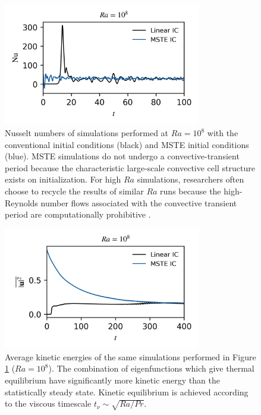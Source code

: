 \documentclass[reprint,amsmath,amssymb,aps]{revtex4-1}
\begin{document}
\begin{figure}
    \begin{minipage}{3.4in}
        \centering
        \includegraphics[width=3.4in]{sim_eq_nu.png}
        \caption{Nusselt numbers of simulations performed at $Ra = 10^8$ with the conventional initial conditions (black) and MSTE initial conditions (blue). 
        MSTE simulations do not undergo a convective-transient period because the characteristic large-scale convective cell structure exists on initialization. For high $Ra$ simulations, researchers often choose to recycle the results of similar $Ra$ runs \cite{Verzicco, Johnston} because the high-Reynolds number flows associated with the convective transient period are computationally prohibitive \cite{Anders_AE}.}
        \label{fig:nu_sim}
    \end{minipage}
\end{figure}

\begin{figure}
    \begin{minipage}{3.4in}
        \centering
        \includegraphics[width=3.4in]{sim_eq_ke.png}
        \caption{Average kinetic energies of the same simulations performed in Figure \ref{fig:nu_sim} ($Ra = 10^8$). 
        The combination of eigenfunctions which give thermal equilibrium have significantly more kinetic energy than the statistically steady state. 
        Kinetic equilibrium is achieved according to the viscous timescale $t_{\nu} \sim \sqrt{Ra / Pr}$.}
        \label{fig:ke_sim}
    \end{minipage}
\end{figure}
\end{document}
